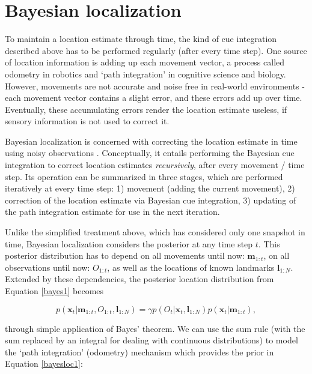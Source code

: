 %
\section{Bayesian localization}
\label{sec:bayesloc}

To maintain a location estimate through time, the kind of cue integration described above has to be performed regularly (after every time step). One source of location information is adding up each movement vector, a process called odometry in robotics and `path integration' in cognitive science and biology. However, movements are not accurate and noise free in real-world environments - each movement vector contains a slight error, and these errors add up over time. Eventually, these accumulating errors render the location estimate useless, if sensory information is not used to correct it. 

Bayesian localization is concerned with correcting the location estimate in time using noisy observations \citep{thrun2005probabilistic}. Conceptually, it entails performing the Bayesian cue integration to correct location estimates \textit{recursively}, after every movement / time step. Its operation can be summarized in three stages, which are performed iteratively at every time step: 1) movement (adding the current movement), 2) correction of the location estimate via Bayesian cue integration, 3) updating of the path integration estimate for use in the next iteration.

Unlike the simplified treatment above, which has considered only one snapshot in time, Bayesian localization considers the posterior at any time step $t$. This posterior distribution has to depend on all movements until now: $\bm m_{1:t}$, on all observations until now: $ O_{1:t}$, as well as the locations of known landmarks $\bm l_{1:N}$. Extended by these dependencies, the posterior location distribution from Equation \ref{bayes1} becomes


\begin{equation}
\label{bayesloc1}
p(\bm x_{t} | \bm m_{1:t}, O_{1:t}, \bm l_{1:N}) = \gamma p(O_{t} | \bm x_{t}, \bm l_{1:N}) p(\bm x_{t} | \bm m_{1:t}),
\end{equation}

\noindent through simple application of Bayes' theorem. We can use the sum rule (with the sum replaced by an integral for dealing with continuous distributions) to model the `path integration' (odometry) mechanism which provides the prior in Equation \ref{bayesloc1}:

